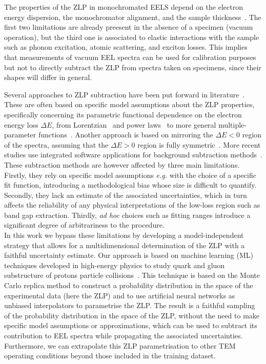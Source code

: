 The properties of the ZLP in monochromated EELS depend on the electron energy dispersion,
the monochromator alignment, and the sample thickness~\cite{Park:2008, Stoger:2008}.
%
The first two limitations are already preesent in the absence of a specimen (vacuum operation),
but the third one is associated
to elastic interactions with the sample such as 
phonon excitation, atomic scattering, and exciton losses.
%
This implies that measurements of vacuum EEL spectra can be used for calibration purposes
but not to directly subtract the ZLP from spectra taken on specimens, since their shapes will differ
in general.

Several approaches to ZLP subtraction have been put forward in 
literature~\cite{Rafferty:2000, Erni:2005, Stoger:2008, Egerton:1996,Dorneich:1998, Benthem:2001, Lazar:2003}.
%
These are often based on specific model assumptions about the ZLP properties, specifically
concerning its parametric functional dependence on the electron energy loss $\Delta E$,
from Lorentzian~\cite{Dorneich:1998}
and power laws~\cite{Erni:2005} to more general multiple-parameter functions~\cite{Benthem:2001}.
%
Another approach is based on mirroring the $\Delta E <0$ region of the spectra, assuming
that the $\Delta E>0$ region is fully symmetric~\cite{Lazar:2003}.
%
More recent studies use integrated software applications for background subtraction 
methods~\cite{Egerton:10.1016/S0304-3991(01)00155-3, Held:2020, Granerod:2018, Fung:2020}.
%
These subtraction methods are however affected by three main limitations.
%
Firstly, they rely on specific model assumptions {\it e.g.} with
the choice of a specific fit function, introducing a methodological
bias whose size is difficult to quantify.
%
Secondly, they lack an estimate of the associated uncertainties, which in turn affects
the reliability of any physical interpretations of the low-loss region such as
band gap extraction.
%
Thirdly, {\it ad hoc} choices such as fitting ranges introduce a significant degree of
arbitrariness to the procedure.\\

In this work we bypass these limitations by developing a model-independent strategy
that allows for a multidimensional determination of the ZLP
with a faithful uncertainty estimate.
%
Our approach is based on machine learning (ML) techniques
developed in high-energy physics to study
quark and gluon substructure of protons
particle collisions~\cite{Ball:2008by,Ball:2012cx,Ball:2014uwa,Ball:2017nwa}.
%
This technique is based on the  Monte Carlo replica method to construct a probability
distribution in the space of the experimental data (here the ZLP) and to use artificial
neural networks as unbiased interpolators to parametrise the ZLP.
%
The result is
a faithful sampling of the probability distribution in the space of the ZLP,
without the need to make specific model assumptions or approximations,
which can be used to subtract its contribution to EEL spectra while
propagating the associated uncertainties.
%
Furthermore, we can extrapolate this ZLP parametrisation to other TEM
operating conditions beyond those included in the training dataset.\\

